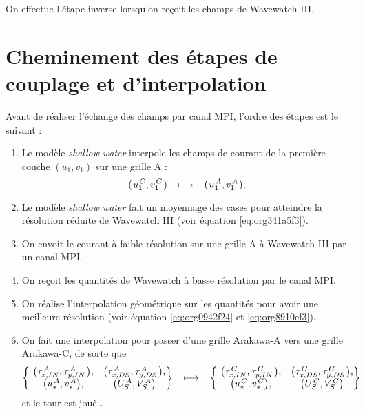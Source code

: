\documentclass[10pt]{report}
\numberwithin{equation}{section}
\newcommand{\pt}{\hspace{1pt}} %
\begin{document}
On effectue l'étape inverse lorsqu'on reçoit les champs de Wavewatch III.

\section{Cheminement des étapes de couplage et d'interpolation}
\label{sec:org63ccd49}

Avant de réaliser l'échange des champs par canal MPI, l'ordre des étapes est le suivant :
\begin{enumerate}
\item Le modèle \emph{shallow water} interpole les champs de courant de la première couche \((u_1,v_1)\) sur une grille A :
\begin{equation}
   (\pt u_1^{\pt C},v_1^{\pt C}\pt) \hspace{0.3cm}\longmapsto \hspace{0.3cm} (\pt u_1^{\pt A},v_1^{\pt A}\pt),
\end{equation}
\item Le modèle \emph{shallow water} fait un moyennage des cases pour atteindre la résolution réduite de Wavewatch III (voir équation \ref{eq:org341a5f3}).
\item On envoit le courant à faible résolution sur une grille A à Wavewatch III par un canal MPI.
\item On reçoit les quantités de Wavewatch à basse résolution par le canal MPI.
\item On réalise l'interpolation géométrique sur les quantités pour avoir une meilleure résolution (voir équation \ref{eq:org0942f24} et \ref{eq:org8910cf3}).
\item On fait une interpolation pour passer d'une grille Arakawa-A vers une grille Arakawa-C, de sorte que
\begin{equation}\qty{\
   \begin{matrix}
     \qty(\tau_{x,IN}^{\pt A},\tau_{y,IN}^{\pt A}\pt), &
     \qty(\tau_{x,DS}^{\pt A},\tau_{y,DS}^{\pt A}\pt), \\
     \qty(u_*^{\pt A},v_*^{\pt A}),   &
     \qty(U_S^{\pt A},V_S^{\pt A})
   \end{matrix}}
   \hspace{0.3cm}\longmapsto \hspace{0.3cm}\qty{\
   \begin{matrix}
     \qty(\tau_{x,IN}^{\pt C},\tau_{y,IN}^{\pt C}\pt), &
     \qty(\tau_{x,DS}^{\pt C},\tau_{y,DS}^{\pt C}\pt), \\
     \qty(u_*^{\pt C},v_*^{\pt C}),   &
     \qty(U_S^{\pt C},V_S^{\pt C})
   \end{matrix}}
   \end{equation}
et le tour est joué\ldots{}\bigskip
\end{enumerate}
\end{document}
